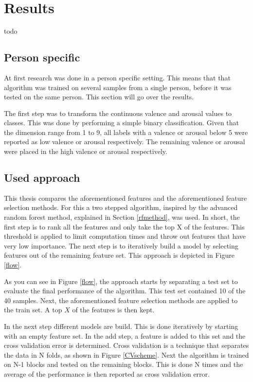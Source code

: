 \chapter{Results}
{\samenvatting todo}
\section{Person specific}
At first research was done in a person specific setting. This means that that algorithm was trained on several samples from a single person, before it was tested on the same person.
This section will go over the results.

\npar

The first step was to transform the continuous valence and arousal values to classes. This was done by performing a simple binary classification. Given that the dimension range from 1 to 9, all labels with a valence or arousal below 5 were reported as low valence or arousal respectively. The remaining valence or arousal were placed in the high valence or arousal respectively.

\section{Used approach}

This thesis compares the aforementioned features and the aforementioned feature selection methods. For this a two stepped algorithm, inspired by the advanced random forest method, explained in Section \ref{rfmethod}, was used. In short, the first step is to rank all the features and only take the top X of the features. This threshold is applied to limit computation times and throw out features that have very low importance. The next step is to iteratively build a model by selecting features out of the remaining feature set. This approach is depicted in Figure \ref{flow}.


As you can see in Figure \ref{flow}, the approach starts by separating a test set to evaluate the final performance of the algorithm. This test set contained 10 of the 40 samples. Next, the aforementioned feature selection methods are applied to the train set. A top $X$ of the features is then kept.

\npar

In the next step different models are build. This is done iteratively by starting with an empty feature set. In the add step, a feature is added to this set and the cross validation error is determined. Cross validation is a technique that separates the data in N folds, as shown in Figure \ref{CVscheme}. Next the algorithm is trained on N-1 blocks and tested on the remaining blocks. This is done N times and the average of the performance is then reported as cross validation error. 

